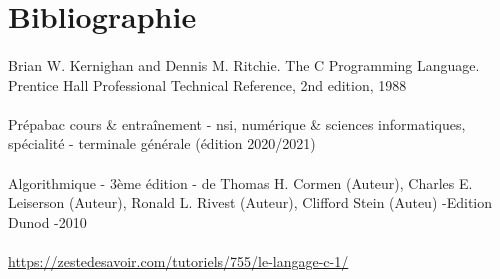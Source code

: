 \documentclass[a4paper, 12pt]{article}
\begin{document}
 \newpage

\section*{Bibliographie}
    \paragraph{\newline}
       Brian W. Kernighan and Dennis M. Ritchie. The C Programming Language. Prentice Hall Professional Technical Reference, 2nd edition, 1988
       \paragraph{\newline}
Prépabac cours & entraînement - nsi, numérique \& sciences informatiques, spécialité - terminale générale (édition 2020/2021)
\paragraph{\newline}
Algorithmique - 3ème édition - de Thomas H. Cormen  (Auteur), Charles E. Leiserson (Auteur), Ronald L. Rivest  (Auteur), Clifford Stein (Auteu) -Edition Dunod -2010
\paragraph{\newline}
\url{https://zestedesavoir.com/tutoriels/755/le-langage-c-1/}
\end{document}
